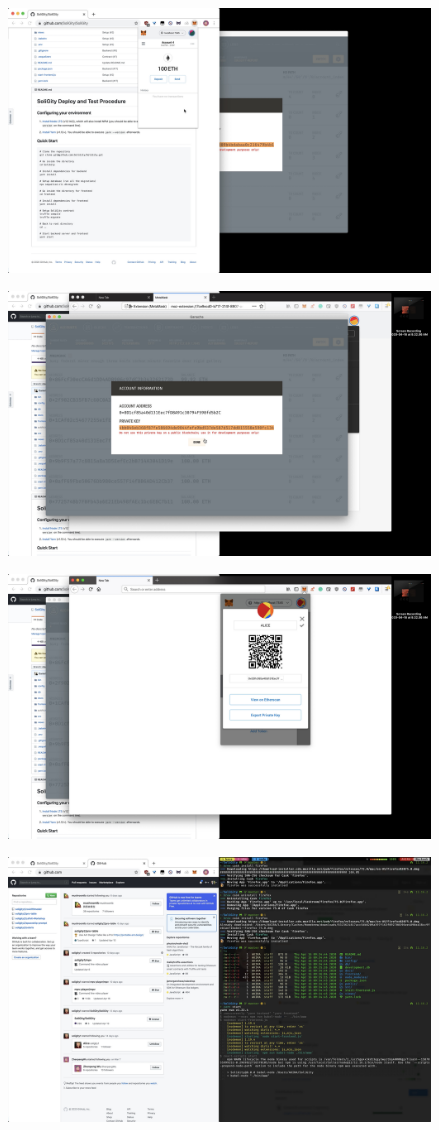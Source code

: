 \documentclass[12pt]{article}
\renewcommand{\_}{\kern-1.5pt\textunderscore\kern-1.5pt}
\begin{document}
\includegraphics[height=7cm]{graphs/11. metamask_setup_bob}

\includegraphics[height=7cm]{graphs/12. metamask_setup_alice}

\includegraphics[height=7cm]{graphs/13. metamask_setup_alice}

\includegraphics[height=7cm]{graphs/14. yarn_start}
\end{document}
